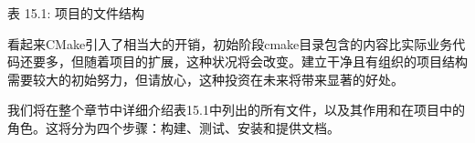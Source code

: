 \begin{center}
表 15.1: 项目的文件结构
\end{center}

看起来CMake引入了相当大的开销，初始阶段cmake目录包含的内容比实际业务代码还要多，但随着项目的扩展，这种状况将会改变。建立干净且有组织的项目结构需要较大的初始努力，但请放心，这种投资在未来将带来显著的好处。

我们将在整个章节中详细介绍表15.1中列出的所有文件，以及其作用和在项目中的角色。这将分为四个步骤：构建、测试、安装和提供文档。















































